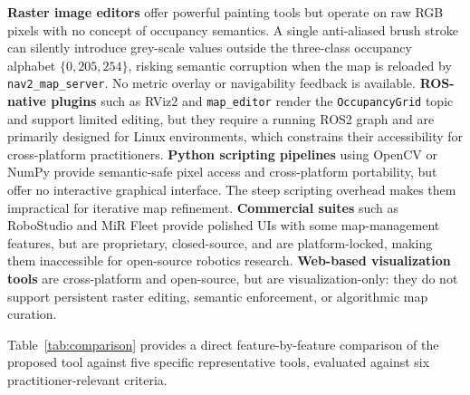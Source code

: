 \documentclass[journal]{IEEEtran}
\begin{document}
\textbf{Raster image editors} \cite{gimp} offer powerful painting tools but operate on raw RGB pixels with no concept of occupancy semantics. A single anti-aliased brush stroke can silently introduce grey-scale values outside the three-class occupancy alphabet $\{0,205,254\}$, risking semantic corruption when the map is reloaded by \texttt{nav2\_map\_server}. No metric overlay or navigability feedback is available.
\textbf{ROS-native plugins} such as RViz2 \cite{rviz2} and \texttt{map\_editor} \cite{mapeditor} render the \texttt{OccupancyGrid} topic and support limited editing, but they require a running ROS2 graph and are primarily designed for Linux environments, which constrains their accessibility for cross-platform practitioners.
\textbf{Python scripting pipelines} using OpenCV or NumPy provide semantic-safe pixel access and cross-platform portability, but offer no interactive graphical interface. The steep scripting overhead makes them impractical for iterative map refinement.
\textbf{Commercial suites} such as RoboStudio \cite{robostudio} and MiR Fleet \cite{mirfleet} provide polished UIs with some map-management features, but are proprietary, closed-source, and are platform-locked, making them inaccessible for open-source robotics research.
\textbf{Web-based visualization tools} \cite{foxglove,webviz} are cross-platform and open-source, but are visualization-only: they do not support persistent raster editing, semantic enforcement, or algorithmic map curation.

Table~\ref{tab:comparison} provides a direct feature-by-feature comparison of the proposed tool against five specific representative tools, evaluated against six practitioner-relevant criteria.
\end{document}
